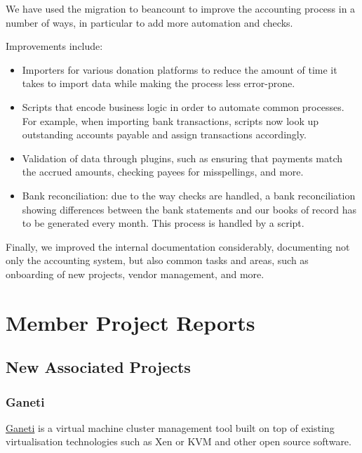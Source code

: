 \documentclass[a4paper]{report}
\begin{document}
We have used the migration to beancount to improve the accounting process in a number of ways, in particular to add more automation and checks.

Improvements include:

\begin{itemize}

\item Importers for various donation platforms to reduce the amount of time it takes to import data while making the process less error-prone.

\item Scripts that encode business logic in order to automate common processes.  For example, when importing bank transactions, scripts now look up outstanding accounts payable and assign transactions accordingly.

\item Validation of data through plugins, such as ensuring that payments match the accrued amounts, checking payees for misspellings, and more.

\item Bank reconciliation: due to the way checks are handled, a bank reconciliation showing differences between the bank statements and our books of record has to be generated every month.  This process is handled by a script.

\end{itemize}

Finally, we improved the internal documentation considerably, documenting not only the accounting system, but also common tasks and areas, such as onboarding of new projects, vendor management, and more.

\chapter{Member Project Reports}

\section{New Associated Projects}

\subsection{Ganeti}

\href{https://www.ganeti.org/}{Ganeti} is a virtual machine cluster management tool built on top of existing virtualisation technologies such as Xen or KVM and other open source software.
\end{document}
